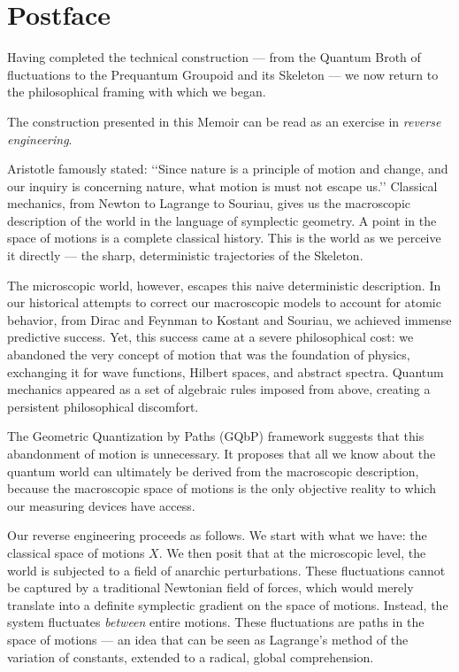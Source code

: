 
\chapter*{Postface}

Having completed the technical construction — from the Quantum Broth
of fluctuations to the Prequantum Groupoid and its Skeleton —
we now return to the philosophical framing with which we began.

The construction presented in this Memoir can be read as an exercise
in \emph{reverse engineering}.

Aristotle famously stated: \lq\lq Since nature is a principle of motion
and change, and our inquiry is concerning nature, what motion is must
not escape us.\rq\rq
Classical mechanics, from Newton to Lagrange to Souriau, gives us the
macroscopic description of the world in the language of symplectic
geometry. A point in the space of motions is a complete classical
history. This is the world as we perceive it directly — the sharp,
deterministic trajectories of the Skeleton.

The microscopic world,
however,
escapes this naive deterministic description.
In our historical attempts to correct our macroscopic models to account for atomic behavior,
from Dirac and Feynman to Kostant and Souriau,
we achieved immense predictive success.
Yet,
this success came at a severe philosophical cost:
we abandoned the very concept of motion that was the foundation of physics,
exchanging it for wave functions,
Hilbert spaces,
and abstract spectra.
Quantum mechanics appeared as a set of algebraic rules imposed from above,
creating a persistent philosophical discomfort.

The Geometric Quantization by Paths (GQbP) framework suggests
that this abandonment of motion is unnecessary.
It proposes that all we know about the quantum world can ultimately be derived from the macroscopic description,
because the macroscopic space of motions is the only objective reality to which our measuring devices have access.

Our reverse engineering proceeds as follows.
We start with what we have:
the classical space of motions $X$.
We then posit that at the microscopic level,
the world is subjected to a field of anarchic perturbations.
These fluctuations cannot be captured by a traditional Newtonian field of forces,
which would merely translate into a definite symplectic gradient on the space of motions.
Instead,
the system fluctuates \emph{between} entire motions.
These fluctuations are paths in the space of motions ---
an idea that can be seen as Lagrange's method of the variation of constants,
extended to a radical,
global comprehension.

